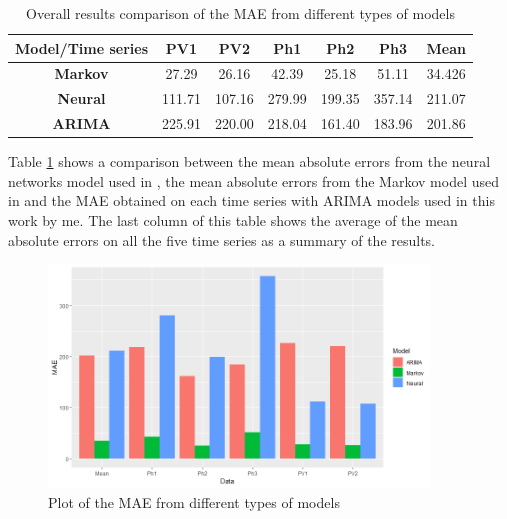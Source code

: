 \documentclass[12pt,a4paper,titlepage]{report}
\begin{document}
\begin{table}[htbp]
    \begin{tabular}{|c|c|c|c|c|c|c|}
        \hline
        \textbf{Model/Time series} & \textbf{PV1} & \textbf{PV2} & \textbf{Ph1} & \textbf{Ph2} & \textbf{Ph3} & \textbf{Mean} \\ \hline
        \textbf{Markov}            & 27.29        & 26.16        & 42.39        & 25.18        & 51.11        & 34.426        \\ \hline
        \textbf{Neural}            & 111.71       & 107.16       & 279.99       & 199.35       & 357.14       & 211.07        \\ \hline
        \textbf{ARIMA}             & 225.91       & 220.00       & 218.04       & 161.40       & 183.96       & 201.86        \\ \hline
    \end{tabular}
    
    \centering
    \caption{Overall results comparison of the MAE from different types of models}
    \label{overallcomparisonMAE}
\end{table}

Table \ref{overallcomparisonMAE} shows a comparison between the mean absolute errors from the neural networks model used in \cite{feilmeier}, the mean absolute errors from the Markov model used in \cite{antonescu} and the MAE obtained on each time series with ARIMA models used in this work by me.
The last column of this table shows the average of the mean absolute errors on all the five time series as a summary of the results.

%
\begin{figure}[htbp]
    \centering
    \includegraphics[width=0.9\textwidth]{doverallcomparisonplot}
    \caption{Plot of the MAE from different types of models}
    \label{doverallcomparisonplot}
\end{figure}
\end{document}
